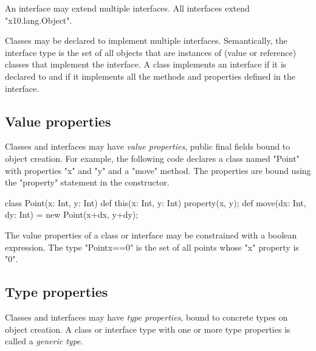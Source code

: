         An interface may extend multiple interfaces.
        All interfaces extend \xcd"x10.lang.Object".

Classes may be declared to implement 
multiple interfaces. 
Semantically, the interface type is the set of all objects that are
instances of (value or reference) classes that implement the
interface. A class implements an interface if it is declared to
and if
it implements all the methods and properties defined in the interface.

\subsection{Value properties}


        Classes and interfaces may have {\em value properties},
        public final fields bound to object creation.  
%
        For example, the following code declares a class named
        \xcd"Point" with properties \xcd"x" and \xcd"y"
        and a \xcd"move" method.  The properties are bound
        using the \xcd"property" statement in the constructor.

\begin{xten}
class Point(x: Int, y: Int) {
  def this(x: Int, y: Int) { property(x, y); }
  def move(dx: Int, dy: Int) = new Point(x+dx, y+dy);
}
\end{xten}

        The value properties of a class or interface may be
        constrained with a boolean expression.  The type
        \xcd"Point{x==0}" is the set of all points whose \xcd"x"
        property is \xcd"0".



\iftypeparams
\else

\subsection{Type properties}
\label{TypeProperties}


        Classes and interfaces may have {\em type properties}, bound
        to concrete types on object creation.
        A class or interface type
        with one or more type properties is called a {\em
        generic type}.

